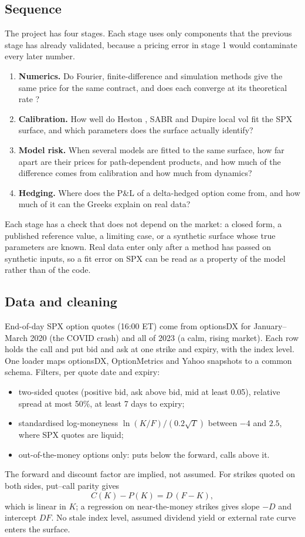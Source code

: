 \documentclass[10pt,letterpaper]{article}
\begin{document}
\subsection{Sequence}
The project has four stages. Each stage uses only components that the previous stage has already validated,
because a pricing error in stage 1 would contaminate every later number.
\begin{enumerate}
\item \textbf{Numerics.} Do Fourier, finite-difference and simulation methods give the same price for the same
contract, and does each converge at its theoretical rate \citep{fang2008,andersen2008,longstaff2001}?
\item \textbf{Calibration.} How well do Heston \citep{heston1993}, SABR \citep{hagan2002} and Dupire local vol
\citep{dupire1994} fit the SPX surface, and which parameters does the surface actually identify?
\item \textbf{Model risk.} When several models are fitted to the same surface, how far apart are their prices for
path-dependent products, and how much of the difference comes from calibration and how much from dynamics?
\item \textbf{Hedging.} Where does the P\&L of a delta-hedged option come from, and how much of it can the
Greeks explain on real data?
\end{enumerate}
Each stage has a check that does not depend on the market: a closed form, a published reference value, a limiting
case, or a synthetic surface whose true parameters are known. Real data enter only after a method has passed
on synthetic inputs, so a fit error on SPX can be read as a property of the model rather than of the code.

\subsection{Data and cleaning}
End-of-day SPX option quotes (16:00 ET) come from optionsDX for January--March 2020 (the COVID crash) and all of
2023 (a calm, rising market). Each row holds the call and put bid and ask at one strike and expiry, with the index
level. One loader maps optionsDX, OptionMetrics and Yahoo snapshots to a common schema. Filters, per quote date
and expiry:
\begin{itemize}
\item two-sided quotes (positive bid, ask above bid, mid at least 0.05), relative spread at most 50\%, at least 7
days to expiry;
\item standardised log-moneyness $\ln(K/F)/(0.2\sqrt{T})$ between $-4$ and $2.5$, where SPX quotes are liquid;
\item out-of-the-money options only: puts below the forward, calls above it.
\end{itemize}
The forward and discount factor are implied, not assumed. For strikes quoted on both sides, put--call parity gives
\begin{equation}
C(K) - P(K) = D\,(F - K),
\end{equation}
which is linear in $K$; a regression on near-the-money strikes gives slope $-D$ and intercept $DF$. No stale index
level, assumed dividend yield or external rate curve enters the surface.
\end{document}
